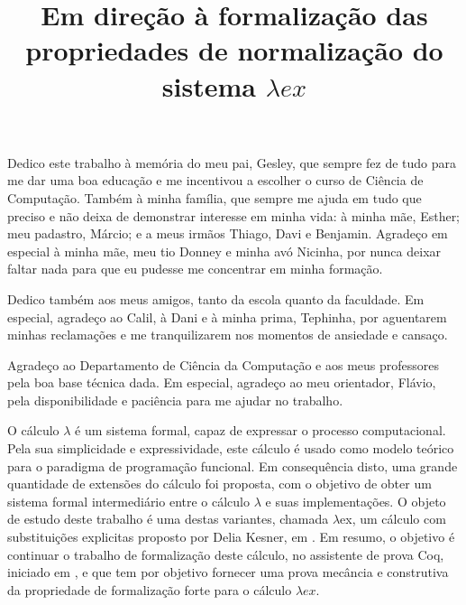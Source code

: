 \documentclass[bacharelado]{unb-cic}
\title{Em direção à formalização das propriedades de normalização do sistema
    $\lambda ex$}%
\begin{document}
  \maketitle
  \pretextual

  \begin{dedicatoria}
      Dedico este trabalho à memória do meu pai, Gesley, que sempre fez de tudo
      para me dar uma boa educação e me incentivou a escolher o curso de Ciência
      de Computação. Também à minha família, que sempre me ajuda em tudo que
      preciso e não deixa de demonstrar interesse em minha vida: à minha
      mãe, Esther; meu padastro, Márcio; e a meus irmãos Thiago, Davi e
      Benjamin. Agradeço em especial à minha mãe, meu tio Donney e minha avó
      Nicinha, por nunca deixar faltar nada para que eu pudesse me concentrar em
      minha formação.

      Dedico também aos meus amigos, tanto da escola quanto da faculdade. Em
      especial, agradeço ao Calil, à Dani e à minha prima, Tephinha, por
      aguentarem minhas reclamações e me tranquilizarem nos momentos de
      ansiedade e cansaço.
  \end{dedicatoria}

  \begin{agradecimentos}
      Agradeço ao Departamento de Ciência da Computação e aos meus professores
      pela boa base técnica dada. Em especial, agradeço ao meu orientador,
      Flávio, pela disponibilidade e paciência para me ajudar no trabalho.
  \end{agradecimentos}

  \begin{resumo}
    O cálculo $\lambda$ é um sistema formal, capaz de expressar o processo
    computacional.  Pela sua simplicidade e expressividade, este cálculo é usado
    como modelo teórico para o paradigma de programação funcional. Em consequência
    disto, uma grande quantidade de extensões do cálculo foi proposta, com o
    objetivo de obter um sistema formal intermediário entre o cálculo $\lambda$ e suas
    implementações.  O objeto de estudo deste trabalho é uma destas variantes,
    chamada $\lambda$ex, um cálculo com substituições explicitas proposto por Delia
    Kesner, em \cite{delia}.  Em resumo, o objetivo é continuar o trabalho de
    formalização deste cálculo, no assistente de prova Coq, iniciado em
    \cite{initial}, e que tem por objetivo fornecer uma prova mecância e
    construtiva da propriedade de formalização forte para o cálculo $\lambda
    ex$.
    \end{resumo}
\end{document}

